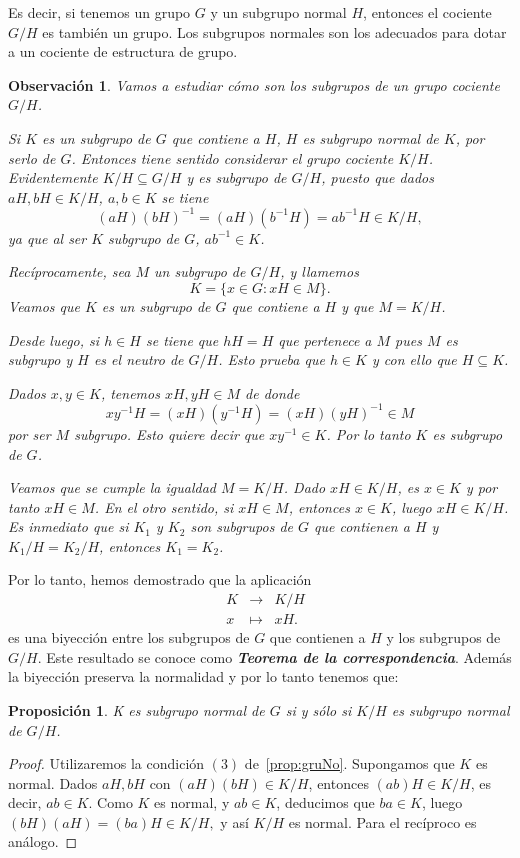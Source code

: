 \documentclass[12pt]{article}
\newtheorem{proposition}[theorem]{Proposición}
\newtheorem{observation}{Observación}[theorem]
\begin{document}
Es decir, si tenemos un grupo $G$ y un subgrupo normal $H$, entonces el cociente $G/H$ es también un grupo. Los subgrupos normales son los adecuados para dotar a un cociente de estructura de grupo. 

\begin{observation}Vamos a estudiar cómo son los subgrupos de un grupo cociente $G/H$.

Si $K$ es un subgrupo de $G$ que contiene a $H$, $H$ es subgrupo normal de $K$, por serlo de $G$. Entonces tiene sentido considerar el grupo cociente $K/H$. Evidentemente $K/H \subseteq G/H$ y es subgrupo de $G/H$, puesto que dados $aH, bH \in K/H$, $a,b \in K$ se tiene $$(aH)(bH)^{-1} = (aH)(b^{-1}H) = ab^{-1}H \in K/H,$$ ya que al ser $K$ subgrupo de $G$, $ab^{-1} \in K$.

Recíprocamente, sea $M$ un subgrupo de $G/H$, y llamemos $$K = \lbrace x \in G : xH \in M \rbrace.$$ Veamos que $K$ es un subgrupo de $G$ que contiene a $H$ y que $M = K/H$.

Desde luego, si $h \in H$ se tiene que $hH = H$ que pertenece a $M$ pues $M$ es subgrupo y $H$ es el neutro de $G/H$. Esto prueba que $h \in K$ y con ello que $H \subseteq K$.

Dados $x,y \in K$, tenemos $xH, yH \in M$ de donde $$xy^{-1}H = (xH)(y^{-1}H) = (xH)(yH)^{-1} \in M$$ por ser $M$ subgrupo. Esto quiere decir que $xy^{-1} \in K$. Por lo tanto $K$ es subgrupo de $G$.

Veamos que se cumple la igualdad $M = K/H$. Dado $xH \in K/H$, es $x \in K$ y por tanto $xH \in M$. En el otro sentido, si $xH \in M$, entonces $x \in K$, luego $xH \in K/H$. Es inmediato que si $K_{1}$ y $K_{2}$ son subgrupos de $G$ que contienen a $H$ y $K_{1}/H = K_{2}/H$, entonces $K_{1} = K_{2}$.
\end{observation}

Por lo tanto, hemos demostrado que la aplicación $$\begin{array}{rccl}
&K & \longrightarrow & K/H\\
&x & \longmapsto &xH.
\end{array}
$$ es una biyección entre los subgrupos de $G$ que contienen a $H$ y los subgrupos de $G/H$. Este resultado se conoce como \textbf{\textit{Teorema de la correspondencia}}. Además la biyección preserva la normalidad y por lo tanto tenemos que:

\begin{proposition} K es subgrupo normal de $G$ si y sólo si $K/H$ es subgrupo normal de $G/H$.\end{proposition}
\begin{proof}
Utilizaremos la condición $(3)$ de~\ref{prop:gruNo}. Supongamos que $K$ es normal. Dados $aH, bH$ con $(aH)(bH) \in K/H$, entonces $(ab)H \in K/H$, es decir, $ab \in K$.
Como $K$ es normal, y $ab \in K$, deducimos que $ba \in K$, luego $(bH)(aH) = (ba)H \in K/H,$ y así $K/H$ es normal. Para el recíproco es análogo.

\end{proof}
\end{document}
